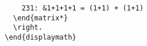 \begin{lstlisting}
    231: &1+1+1+1 = (1+1) + (1+1)                                                                                                                                                                                                                                                                                              
  \end{matrix*}                                                                                                                                                                                                                                                                                                                
  \right.                                                                                                                                                                                                                                                                                                                      
\end{displaymath}                                                                                                                                                                                                                                                                                                              
\end{lstlisting}  
